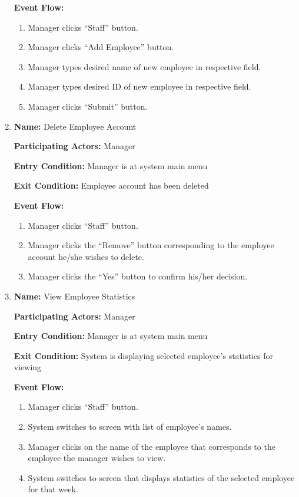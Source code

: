 \documentclass[11pt]{article}
\begin{document}
\begin{enumerate}
			\textbf{Event Flow:}
			\begin{enumerate}
				\setlength{\leftskip}{1cm}
				\item Manager clicks ``Staff'' button.
				\item Manager clicks ``Add Employee'' button.
				\item Manager types desired name of new employee in respective field.
				\item Manager types desired ID of new employee in respective field.
				\item Manager clicks ``Submit'' button.
			\end{enumerate}

		\item \textbf{Name:} 				Delete Employee Account

			\textbf{Participating Actors:} 	Manager

			\textbf{Entry Condition:} 		Manager is at system main menu

			\textbf{Exit Condition:} 		Employee account has been deleted

			\textbf{Event Flow:}
			\begin{enumerate}
				\setlength{\leftskip}{1cm}
				\item Manager clicks ``Staff'' button.
				\item Manager clicks the ``Remove'' button corresponding to the employee account he/she wishes to delete.
				\item Manager clicks the ``Yes'' button to confirm his/her decision.\\
			\end{enumerate}

		\item \textbf{Name:} 				View Employee Statistics

			\textbf{Participating Actors:} 	Manager

			\textbf{Entry Condition:} 		Manager is at system main menu

			\textbf{Exit Condition:} 		System is displaying selected employee's statistics for viewing

			\textbf{Event Flow:}
			\begin{enumerate}
				\setlength{\leftskip}{1cm}
				\item Manager clicks ``Staff'' button.
				\item System switches to screen with list of employee's names.
				\item Manager clicks on the name of the employee that corresponds to the employee the manager wishes to view.
				\item System switches to screen that displays statistics of the selected employee for that week.\\
			\end{enumerate}


\end{enumerate}
\end{document}
